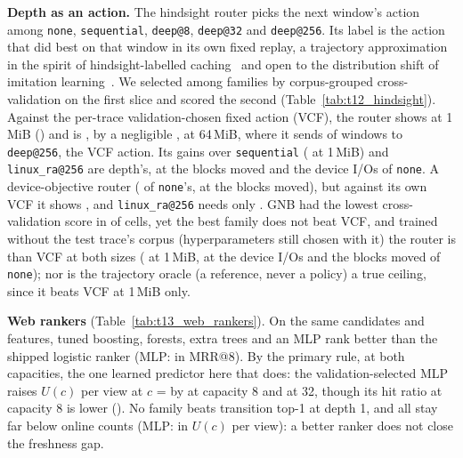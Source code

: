 \textbf{Depth as an action.} The hindsight router picks the next window's
action among \texttt{none}, \texttt{sequential}, \texttt{deep@8},
\texttt{deep@32} and \texttt{deep@256}. Its label is the action that did best
on that window in its own fixed replay, a trajectory approximation in the
spirit of hindsight-labelled caching~\cite{jain2016hawkeye} and open to the
distribution shift of imitation learning~\cite{ross2011reduction}. We selected
among \hsrCvFamilies{} families by corpus-grouped cross-validation on the
first slice and scored the second (Table~\ref{tab:t12_hindsight}). Against the
per-trace validation-chosen fixed action (VCF), the router shows
\decHsrHOneHitRatioRoutedHitVsVcfHitOneMiBVerdict{} at 1\,MiB
(\decHsrHOneHitRatioRoutedHitVsVcfHitOneMiBPairedCI) and is
\decHsrHOneHitRatioRoutedHitVsVcfHitSixtyFourMiBVerdict, by a negligible
\decHsrHOneHitRatioRoutedHitVsVcfHitSixtyFourMiBPaired, at 64\,MiB, where it
sends \hsrDeepShareRoutedHitSixtyFourMiB{} of windows to \texttt{deep@256}, the
VCF action. Its gains over \texttt{sequential}
(\decHsrHTwoHitRatioRoutedHitVsSequentialOneMiBPaired{} at 1\,MiB) and
\texttt{linux\_ra@256} are depth's, at \hsrMovedRatioRoutedHitOneMiB{} the
blocks moved and \hsrIORatioRoutedHitOneMiB{} the device I/Os of
\texttt{none}. A device-objective router
\decHsrDDeviceIosRoutedDevVsNoneOneMiBVerdict{}
(\decHsrDDeviceIosRoutedDevVsNoneOneMiBPaired{} of \texttt{none}'s, at
\decHsrDBlocksMovedRoutedDevVsNoneOneMiBPaired{} the blocks moved), but against
its own VCF it shows \decHsrHFourDeviceIosRoutedDevVsVcfDevOneMiBVerdict, and
\texttt{linux\_ra@256} needs only \hsrIORatioLinuxRaAtTwoHundredFiftySixOneMiB.
GNB had the lowest cross-validation score in \hsrCvGnbLowest{} of
\hsrCvCells{} cells, yet the best family does not beat VCF, and trained
without the test trace's corpus (hyperparameters still chosen with it) the
router is \decHsrHSixHitRatioRoutedHitLocoVsVcfHitOneMiBVerdict{} than VCF at
both sizes (\decHsrHSixHitRatioRoutedHitLocoVsVcfHitOneMiBPairedCI{} at
1\,MiB, at \hsrIORatioRoutedHitLocoOneMiB{} the device I/Os and
\hsrMovedRatioRoutedHitLocoOneMiB{} the blocks moved of \texttt{none}); nor is the
trajectory oracle (a reference, never a policy) a true ceiling, since it beats
VCF at 1\,MiB only.

\textbf{Web rankers} (Table~\ref{tab:t13_web_rankers}). On the same candidates
and features, tuned boosting, forests, extra trees and an MLP rank better than
the shipped logistic ranker (MLP: \decWrkKOneMlpMrrAtEightCI{} in MRR@8). By the
primary rule, \decWrkRuleTwoCapEightVerdict{} at both capacities, the one
learned predictor here that does: the validation-selected MLP raises $U(c)$ per
view at $c$ = \webHeadlineCost{} by \decWrkSOneMlpUtilityPerViewCapEightCI{} at
capacity 8 and \decWrkSOneMlpUtilityPerViewCapThirtyTwoCI{} at 32, though its
hit ratio at capacity 8 is lower (\decWrkSOneMlpHitRatioCapEightCI). No family
beats transition top-1 at depth 1, and all stay far below online counts (MLP:
\decWrkKFiveMlpUtilityPerViewCapEightCI{} in $U(c)$ per view): a better ranker does not close the
freshness gap.
